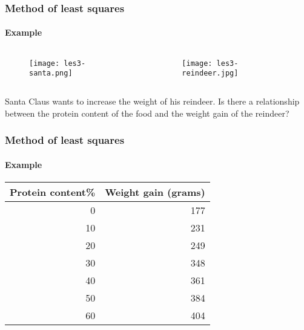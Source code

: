 \documentclass[aspectratio=169]{beamer}
\begin{document}
\begin{frame}[plain]
  \frametitle{Method of least squares}
  \framesubtitle{Example}
  \begin{columns}
    \begin{column}{0.5\textwidth}
      
      \begin{figure}
        \centering
        \texttt{[image: les3-santa.png]}
        \label{fig:les3-santa}
      \end{figure}
      
    \end{column}
    \begin{column}{0.5\textwidth}
      
      \begin{figure}
        \centering
        \texttt{[image: les3-reindeer.jpg]}
        \label{fig:les3-reindeer}
      \end{figure}
      
    \end{column}
  \end{columns}

  \bigskip
  Santa Claus wants to increase the weight of his reindeer. Is there a relationship between the protein content of the food and the weight gain of the reindeer?
  
\end{frame}

\begin{frame}
  \frametitle{Method of least squares}
  \framesubtitle{Example}
  
  \begin{table}[h]
    \centering
    \small
    \begin{tabular}{@{}rr@{}} \toprule
      Protein content\%& Weight gain (grams)  \\
      \midrule
      0   & 177 \\
      10  & 231 \\
      20  & 249 \\
      30  & 348 \\
      40  & 361 \\
      50  & 384 \\
      60  & 404 \\
      \bottomrule
    \end{tabular}
  \end{table}
\end{frame}
\end{document}
